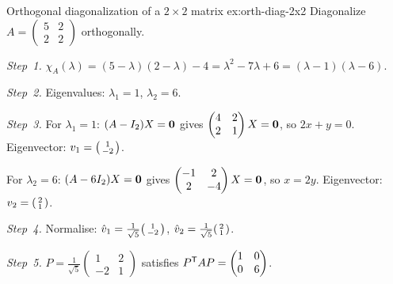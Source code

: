\begin{example}{Orthogonal diagonalization of a $2\times 2$ matrix}%
{ex:orth-diag-2x2}
Diagonalize $A = \begin{pmatrix} 5 & 2 \\ 2 & 2 \end{pmatrix}$
orthogonally.

\emph{Step~1.} $\chi_A(\lambda) = (5-\lambda)(2-\lambda)-4
= \lambda^2-7\lambda+6 = (\lambda-1)(\lambda-6)$.

\emph{Step~2.} Eigenvalues: $\lambda_1=1$, $\lambda_2=6$.

\emph{Step~3.}
For $\lambda_1=1$: $(A-I_2)X=\mathbf{0}$ gives
$\begin{pmatrix}4&2\\2&1\end{pmatrix}X=\mathbf{0}$, so $2x+y=0$.
Eigenvector: $v_1 = \begin{psmallmatrix}1\\-2\end{psmallmatrix}$.

For $\lambda_2=6$: $(A-6I_2)X=\mathbf{0}$ gives
$\begin{pmatrix}-1&2\\2&-4\end{pmatrix}X=\mathbf{0}$, so $x=2y$.
Eigenvector: $v_2 = \begin{psmallmatrix}2\\1\end{psmallmatrix}$.

\emph{Step~4.} Normalise:
$\hat v_1 = \frac{1}{\sqrt{5}}\begin{psmallmatrix}1\\-2\end{psmallmatrix}$,
$\hat v_2 = \frac{1}{\sqrt{5}}\begin{psmallmatrix}2\\1\end{psmallmatrix}$.

\emph{Step~5.}
$P = \frac{1}{\sqrt{5}}\begin{pmatrix}1&2\\-2&1\end{pmatrix}$
satisfies ${P}^{\mathsf{T}}AP = \begin{pmatrix}1&0\\0&6\end{pmatrix}$.
\end{example}

